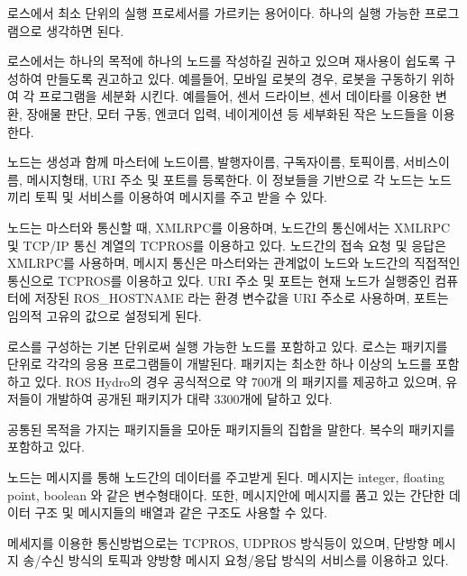 \begin{definition}[노드(node)]
로스에서 최소 단위의 실행 프로세서를 가르키는 용어이다. 하나의 실행 가능한 프로그램으로 생각하면 된다. 

로스에서는 하나의 목적에 하나의 노드를 작성하길 권하고 있으며 재사용이 쉽도록 구성하여 만들도록 권고하고 있다. 예를들어, 모바일 로봇의 경우, 로봇을 구동하기 위하여 각 프로그램을 세분화 시킨다. 예를들어, 센서 드라이브, 센서 데이타를 이용한 변환, 장애물 판단, 모터 구동, 엔코더 입력, 네이게이션 등 세부화된 작은 노드들을 이용한다.

노드는 생성과 함께 마스터에 노드이름, 발행자이름, 구독자이름, 토픽이름, 서비스이름, 메시지형태, URI 주소 및 포트를 등록한다. 이 정보들을 기반으로 각 노드는 노드끼리 토픽 및 서비스를 이용하여 메시지를 주고 받을 수 있다.

노드는 마스터와 통신할 때, XMLRPC를 이용하며, 노드간의 통신에서는 XMLRPC 및 TCP/IP 통신 계열의 TCPROS를 이용하고 있다. 노드간의 접속 요청 및 응답은  XMLRPC를 사용하며, 메시지 통신은 마스터와는 관계없이 노드와 노드간의 직접적인 통신으로 TCPROS를 이용하고 있다. URI 주소 및 포트는 현재 노드가 실행중인 컴퓨터에 저장된 ROS\_HOSTNAME 라는 환경 변수값을 URI 주소로 사용하며, 포트는 임의적 고유의 값으로 설정되게 된다.  
\end{definition}

\begin{definition}
로스를 구성하는 기본 단위로써 실행 가능한 노드를 포함하고 있다. 로스는 패키지를 단위로 각각의 응용 프로그램들이 개발된다. 패키지는 최소한 하나 이상의 노드를 포함하고 있다. ROS Hydro의 경우 공식적으로 약 700개 의 패키지를 제공하고 있으며, 유저들이 개발하여 공개된 패키지가 대략 3300개에 달하고 있다. 
\end{definition}

\begin{definition}
공통된 목적을 가지는 패키지들을 모아둔 패키지들의 집합을 말한다. 복수의 패키지를 포함하고 있다.
\end{definition}

\begin{definition}
노드는 메시지를 통해 노드간의 데이터를 주고받게 된다. 메시지는 integer, floating point, boolean 와 같은 변수형태이다. 또한, 메시지안에 메시지를 품고 있는 간단한 데이터 구조 및 메시지들의 배열과 같은 구조도 사용할 수 있다. 

메세지를 이용한 통신방법으로는 TCPROS, UDPROS 방식등이 있으며, 단방향 메시지 송/수신 방식의 토픽과 양방향 메시지 요청/응답 방식의 서비스를 이용하고 있다.
\end{definition}

